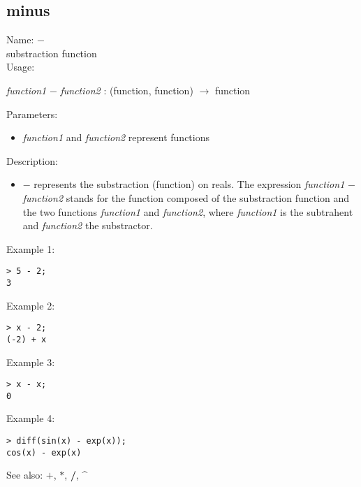 \subsection{ minus }
\noindent Name: \textbf{$-$}\\
substraction function\\

\noindent Usage: 
\begin{center}
\emph{function1} \textbf{$-$} \emph{function2} : (\textsf{function}, \textsf{function}) $\rightarrow$ \textsf{function}\\
\end{center}
Parameters: 
\begin{itemize}
\item \emph{function1} and \emph{function2} represent functions
\end{itemize}
\noindent Description: \begin{itemize}

\item \textbf{$-$} represents the substraction (function) on reals. 
   The expression \emph{function1} \textbf{$-$} \emph{function2} stands for
   the function composed of the substraction function and the two
   functions \emph{function1} and \emph{function2}, where \emph{function1} is 
   the subtrahent and \emph{function2} the substractor.
\end{itemize}
\noindent Example 1: 
\begin{center}\begin{minipage}{15cm}\begin{Verbatim}[frame=single]
> 5 - 2;
3
\end{Verbatim}
\end{minipage}\end{center}
\noindent Example 2: 
\begin{center}\begin{minipage}{15cm}\begin{Verbatim}[frame=single]
> x - 2;
(-2) + x
\end{Verbatim}
\end{minipage}\end{center}
\noindent Example 3: 
\begin{center}\begin{minipage}{15cm}\begin{Verbatim}[frame=single]
> x - x;
0
\end{Verbatim}
\end{minipage}\end{center}
\noindent Example 4: 
\begin{center}\begin{minipage}{15cm}\begin{Verbatim}[frame=single]
> diff(sin(x) - exp(x));
cos(x) - exp(x)
\end{Verbatim}
\end{minipage}\end{center}
See also: \textbf{$+$}, \textbf{$*$}, \textbf{/}, \textbf{\^}
